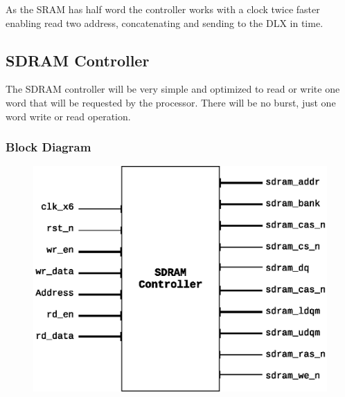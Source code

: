 \documentclass{article}
\begin{document}
As the SRAM has half word the controller works with a clock twice faster enabling read two address, concatenating and sending to the DLX in time.

\newpage
  \subsection{SDRAM Controller}
  The SDRAM controller will be very simple and optimized to read or write one word that will be requested by the processor. There will be no burst, just one word write or read operation.
    \subsubsection{Block Diagram}
  \begin{figure}[H]
    \centering
    \includegraphics[width=\linewidth]{pictures/blocks/sdram_block.eps}
  \end{figure}  
\end{document}
